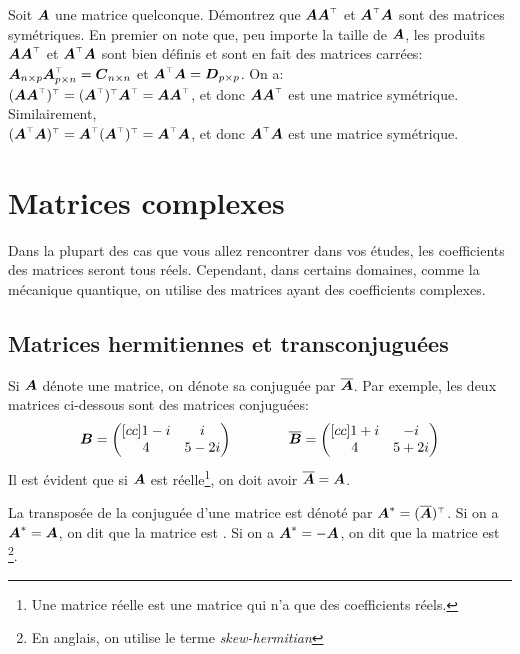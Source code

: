 \begin{exemple}
    Soit $\boldsymbol{A}$ une matrice quelconque.  Démontrez que $\matA\transp{\matA}$ et $\transp{\matA}\matA$ sont des matrices symétriques.
    \solution
    En premier on note que, peu importe la taille de $\boldsymbol{A}$, les produits $\matA\transp{\matA}$ et $\transp{\matA}\matA$ sont bien
    définis et sont en fait des matrices carrées: $\matA_{n\times p}\transp{\matA}_{p \times n} = \matC_{n\times n}$
    et $\transp{\matA}\matA = \matD_{p\times p}$. 
    On a:\\ $\transp{(\matA\transp{\matA})} = \transp{(\transp{\matA})} \transp{\matA} = \matA\transp{\matA}$, et donc $\matA\transp{\matA}$ est une matrice symétrique.
    Similairement,\\ $\transp{(\transp{\matA}\matA)} = \transp{\matA}\transp{(\transp{\matA})}  = \transp{\matA}\matA$, et donc $\transp{\matA}\matA$ est une matrice symétrique.
\end{exemple}

\section{Matrices complexes}

Dans la plupart des cas que vous allez rencontrer dans vos études, 
les coefficients des matrices seront tous réels. 
Cependant, dans certains domaines, comme la mécanique quantique, on utilise des matrices
ayant des coefficients complexes.

\subsection{Matrices hermitiennes et transconjuguées}
Si $\boldsymbol{A}$ dénote une matrice, on dénote sa conjuguée par $\overline{\boldsymbol{A}}$.  Par exemple, les
deux matrices ci-dessous sont des matrices conjuguées:
\[
\boldsymbol{B} = 
\begin{pmatrix}[cc]
1-i & i \\
4 & 5-2i
\end{pmatrix}
\qquad \qquad \overline{\boldsymbol{B}}=
\begin{pmatrix}[cc]
1+i & -i \\
4 & 5+2i
\end{pmatrix}
\]
Il est évident que si $\boldsymbol{A}$ est réelle\footnote{Une matrice réelle est une matrice qui n'a que
des coefficients réels.}, on doit avoir $\overline{\boldsymbol{A}} = \boldsymbol{A}$.

La transposée de la conjuguée d'une matrice est dénoté par $\matA^* = \transp{(\overline{\matA})}$.
Si on a $\boldsymbol{A}^* = \boldsymbol{A}$, on dit que la matrice est .
Si on a $\boldsymbol{A}^* = -\boldsymbol{A}$, on dit que la matrice est \footnote{En anglais, on utilise le terme
\textit{skew-hermitian}}.

